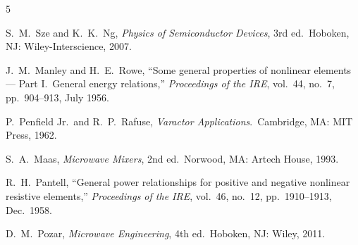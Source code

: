 \documentclass[12pt]{article}
\begin{document}
\begin{thebibliography}{5}
\setlength{\itemsep}{2pt}
\setlength{\parsep}{0pt}

S.\ M.\ Sze and K.\ K.\ Ng, \textit{Physics of Semiconductor Devices}, 3rd ed.\ Hoboken, NJ: Wiley-Interscience, 2007.

J.\ M.\ Manley and H.\ E.\ Rowe, ``Some general properties of nonlinear elements --- Part I.\ General energy relations,'' \textit{Proceedings of the IRE}, vol.\ 44, no.\ 7, pp.\ 904--913, July 1956.

P.\ Penfield Jr.\ and R.\ P.\ Rafuse, \textit{Varactor Applications}.\ Cambridge, MA: MIT Press, 1962.

S.\ A.\ Maas, \textit{Microwave Mixers}, 2nd ed.\ Norwood, MA: Artech House, 1993.

R.\ H.\ Pantell, ``General power relationships for positive and negative nonlinear resistive elements,'' \textit{Proceedings of the IRE}, vol.\ 46, no.\ 12, pp.\ 1910--1913, Dec.\ 1958.

D.\ M.\ Pozar, \textit{Microwave Engineering}, 4th ed.\ Hoboken, NJ: Wiley, 2011.

\end{thebibliography}
\end{document}
